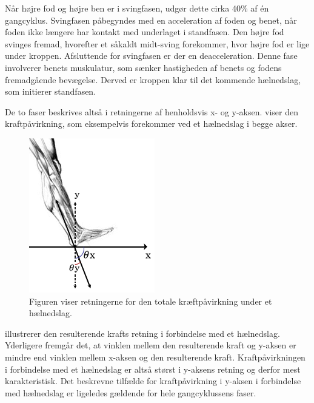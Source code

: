Når højre fod og højre ben er i svingfasen, udgør dette cirka 40\% af én gangcyklus. Svingfasen påbegyndes med en acceleration af foden og benet, når foden ikke længere har kontakt med underlaget i standfasen. Den højre fod svinges fremad, hvorefter et såkaldt midt-sving forekommer, hvor højre fod er lige under kroppen. Afsluttende for svingfasen er der en deacceleration. Denne fase involverer benets muskulatur, som sænker hastigheden af benets og fodens fremadgående bevægelse. Derved er kroppen klar til det kommende hælnedslag, som initierer standfasen. \citep{VaughanDavisOConnor1992,Whittle1990}

De to faser beskrives altså i retningerne af henholdsvis x- og y-aksen.  viser den kraftpåvirkning, som eksempelvis forekommer ved et hælnedslag i begge akser.  
\begin{figure}[H]
	\centering
	\includegraphics[scale=0.7]{figures/bProblemloesning/kraefter_akser.png}
	\caption{Figuren viser retningerne for den totale kræftpåvirkning under et hælnedslag.}
	\label{fig:kraefter_akser}
\end{figure} %
 illustrerer den resulterende krafts retning i forbindelse med et hælnedslag. Yderligere fremgår det, at vinklen mellem den resulterende kraft og y-aksen er mindre end vinklen mellem x-aksen og den resulterende kraft. Kraftpåvirkningen i forbindelse med et hælnedslag er altså størst i y-aksens retning og derfor mest karakteristisk. Det beskrevne tilfælde for kraftpåvirkning i y-aksen i forbindelse med hælnedslag er ligeledes gældende for hele gangcyklussens faser. \citep{Rueterbories2010,Serway2010,ClelandKikhia2013}
